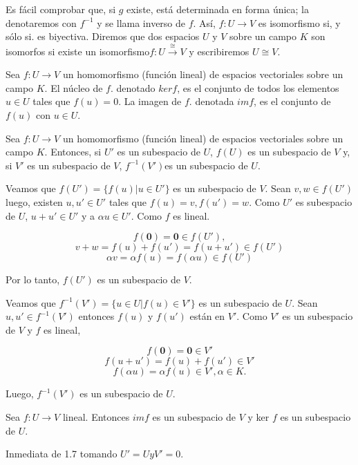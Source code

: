 				Es fácil comprobar que, si $ g $ existe, está determinada en forma única; la denotaremos con $ f^{-1} $ y se llama inverso de $ f $. Así, $ f:U \rightarrow V  $ es isomorfismo si, y sólo si. es biyectiva. Diremos que dos espacios $ U $ y $ V $ sobre un campo $ K $ son isomorfos si existe un isomorfismo$ f:U \overset{\cong}{\rightarrow} V$ y escribiremos $ U \cong V $.
				
				\begin{defi}
					Sea $ f:U \rightarrow V  $ un homomorfismo (función lineal) de espacios vectoriales sobre un campo $ K $. El núcleo de $ f $. denotado $ ker f $, es el conjunto de todos los elementos $ u \in U $ tales que $ f(u) = 0 $. La imagen de $ f $. denotada $ im f $, es el conjunto de $ f(u) $ con $u \in U $.
				\end{defi}
			
				\begin{pro}
					Sea  $ f:U \rightarrow V $ un homomorfismo (función lineal)
					de espacios vectoriales sobre un campo $ K $. Entonces, si $ U' $ es un subespacio de $ U $, $ f(U) $	es un subespacio de $ V $ y, si $ V' $ es un subespacio de $ V $, $ f^{-1}( V') $es un subespacio de $ U $.
				\end{pro}
				\begin{demo}
					Veamos que $ f(U') = \{f(u)|u \in U'\} $ es un subespacio de $ V $. Sean $ v,w \in f(U') $ luego, existen $ u, u' \in U' $ tales que $ f(u) = v, f(u') = w $. Como $ U' $ es subespacio de $ U $, $ u + u' \in  U' $ y a $ \alpha u \in U' $. Como $ f $ es lineal.
					
					\[ f(\mathbf{0}) = \mathbf{0} \in f(U'),\] 
					\[ 	v+w = f(u)+f(u')=f(u+u') \in f(U') \]
					\[ \alpha v = \alpha f(u) = f(\alpha u) \in f(U')\]
				\end{demo}
				Por lo tanto, $ f(U') $ es un subespacio de $ V $.
				
				Veamos que $ f^{-1}(V') = \{u \in U|f(u) \in V'\}$ es un subespacio de $ U $. Sean $ u,u' \in f^{-1}(V')$ entonces $ f(u) $ y $ f(u') $ están en $ V' $. Como $ V' $ es un subespacio de $ V $ y $ f $ es lineal,
				
				\[ f(\mathbf{0}) = \mathbf{0} \in V'\]
				\[ f(u + u') = f(u) + f(u') \in V'\]
				\[ f(\alpha u) = \alpha f(u) \in V', \alpha \in K. \]
				
				Luego,	$ f^{-1}(V') $ es un subespacio de $ U $.
				
				\begin{coro}
					Sea $ f:U \rightarrow V $ lineal. Entonces $ im f $ es un subespacio de $ V $ y ker $ f $ es un subespacio de $ U $.
				\end{coro}
				\begin{demo}
					Inmediata de 1.7 tomando $ U' = U y V' = 0 $.
				\end{demo}
			
